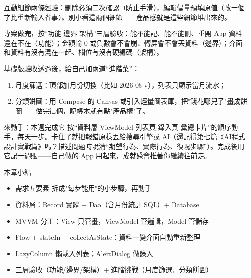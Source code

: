 互動細節兩條經驗：刪除必須二次確認（防止手滑），編輯儘量預填原值（改一個字比重新輸入省事）。別小看這兩個細節——產品感就是這些細節堆出來的。



專案做完，按“功能 邊界 架構”三層驗收：能不能記、能不能刪、重開 App 資料還在不在（功能）；金額輸 0 或負數會不會崩、轉屏會不會丟資料（邊界）；介面和資料有沒有混在一起、欄位有沒有硬編碼（架構）。

基礎版驗收透過後，給自己加兩道“進階菜”：

\begin{enumerate}
  \item 月度篩選：頂部加月份切換（比如 2026-08 v），列表只顯示當月流水；
  \item 分類餅圖：用 Compose 的 Canvas 或引入輕量圖表庫，把"錢花哪兒了"畫成餅圖——做完這個，記帳本就有點"產品樣"了。
\end{enumerate}

\begin{tcbpractice}{來動手：本週完成它}
按“資料層 ViewModel 列表頁 錄入頁 彙總卡片”的順序動手，每天一步。卡住了就把報錯原樣丟給搜尋引擎或 AI（還記得第七篇《AI程式設計實戰篇》嗎？描述問題時說清“期望行為、實際行為、復現步驟”）。完成後用它記一週賬——自己做的 App 用起來，成就感會推著你繼續往前走。

\end{tcbpractice}

\begin{tcbsummary}{本章小結}
\begin{itemize}
  \item 需求五要素 拆成"每步能用"的小步驟，再動手
  \item 資料層：Record 實體 + Dao（含月份統計 SQL）+ Database
  \item MVVM 分工：View 只管畫，ViewModel 管邏輯，Model 管儲存
  \item Flow + stateIn + collectAsState：資料一變介面自動重新整理
  \item LazyColumn 懶載入列表；AlertDialog 做錄入
  \item 三層驗收（功能/邊界/架構）+ 進階挑戰（月度篩選、分類餅圖）
\end{itemize}

\end{tcbsummary}
